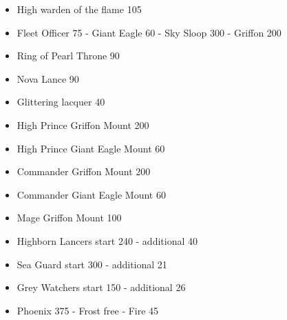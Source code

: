 \subtitle{Points}
\begin{itemize}
\item High warden of the flame 105
\item Fleet Officer 75
- Giant Eagle 60
- Sky Sloop 300
- Griffon 200
\item Ring of Pearl Throne 90
\item Nova Lance 90
\item Glittering lacquer 40
\item High Prince Griffon Mount 200
\item High Prince Giant Eagle Mount 60
\item Commander Griffon Mount 200
\item Commander Giant Eagle Mount 60
\item Mage Griffon Mount 100
\item Highborn Lancers start 240
- additional 40
\item Sea Guard start 300
- additional 21
\item Grey Watchers start 150
- additional 26
\item Phoenix 375
- Frost free
- Fire 45
\end{itemize}


